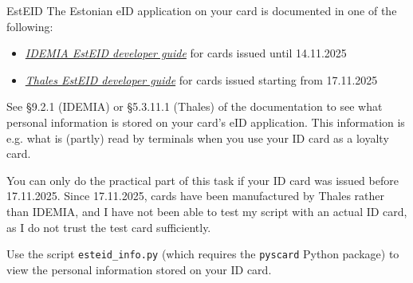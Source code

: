 \documentclass{practice}
\begin{document}
\begin{task}{EstEID}
  The Estonian eID application on your card is documented in one of the following:
  \begin{itemize}
    \item \href{https://www.id.ee/wp-content/uploads/2026/03/id1developerguide2025.pdf}{\textit{IDEMIA EstEID developer guide}} for cards issued until 14.11.2025
    \item \href{https://www.id.ee/wp-content/uploads/2025/11/ged24035_015_tdc_est_eid_developer_guide.pdf}{\textit{Thales EstEID developer guide}} for cards issued starting from 17.11.2025
  \end{itemize}

  See \S 9.2.1 (IDEMIA) or \S 5.3.11.1 (Thales) of the documentation to see what personal information is stored on your card's eID application.
  This information is e.g. what is (partly) read by terminals when you use your ID card as a loyalty card.

  \begin{tcolorbox}[title=Note]
    You can only do the practical part of this task if your ID card was issued before 17.11.2025.
    Since 17.11.2025, cards have been manufactured by Thales rather than IDEMIA, and I have not been able to test my script with an actual ID card, as I do not trust the test card sufficiently.
  \end{tcolorbox}

  Use the script \texttt{esteid\_info.py} (which requires the \texttt{pyscard} Python package) to view the personal information stored on your ID card.
\end{task}
\end{document}
